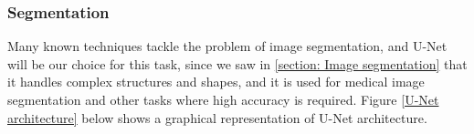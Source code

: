 \documentclass[12pt]{diazessay}
\newcommand{\RomanNumeralCaps}[1]
{\MakeUppercase{\romannumeral #1}}
\begin{document}
    
    \subsubsection{Segmentation}
    \hspace{0.7cm} Many known techniques tackle the problem of image segmentation, and U-Net will be our choice for this task, since we saw in \ref{section: Image segmentation} that it handles complex structures and shapes, and it is used for medical image segmentation and other tasks where high accuracy is required. Figure \ref{U-Net architecture} below shows a graphical representation of U-Net architecture.
    
    
    
\end{document}

